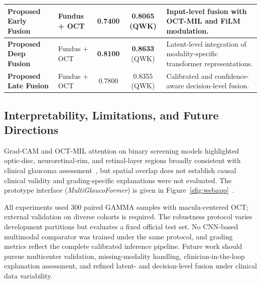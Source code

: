 \documentclass[sn-mathphys]{sn-jnl}%
\theoremstyle{thmstyleone}%
\theoremstyle{thmstyletwo}%
\theoremstyle{thmstylethree}%
\begin{document}
\begin{table}[!t]
{\begin{tabular}{|p{}|p{}|c|c|p{}|}
            \textbf{Proposed Early Fusion}                     &
            Fundus + OCT                                       &
            0.7400                                             &
            0.8065 (QWK)                                       &
            Input-level fusion with OCT-MIL and FiLM modulation.                               \\
            \hline
            \textbf{Proposed Deep Fusion}                      &
            Fundus + OCT                                       &
            \textbf{0.8100}                                    &
            \textbf{0.8633} (QWK)                              &
            Latent-level integration of modality-specific transformer representations.         \\
            \hline
            \textbf{Proposed Late Fusion}                      &
            Fundus + OCT                                       &
            0.7800                                             &
            0.8355 (QWK)                                       &
            Calibrated and confidence-aware decision-level fusion.                             \\
            \hline
        \end{tabular}}
\end{table}


\subsection{Interpretability, Limitations, and Future Directions}
\label{subsec:interpretability_discussion}

Grad-CAM and OCT-MIL attention on binary screening models highlighted optic-disc, neuroretinal-rim, and retinal-layer regions broadly consistent with clinical glaucoma assessment~\cite{kanski10}, but spatial overlap does not establish causal clinical validity and grading-specific explanations were not evaluated. The prototype interface (\textit{MultiGlaucoFormer}) is given in Figure~\ref{sfig:webapp}~\cite{multiglaucoformer_webapp}.

All experiments used 300 paired GAMMA samples with macula-centered OCT; external validation on diverse cohorts is required. The robustness protocol varies development partitions but evaluates a fixed official test set. No CNN-based multimodal comparator was trained under the same protocol, and grading metrics reflect the complete calibrated inference pipeline. Future work should pursue multicenter validation, missing-modality handling, clinician-in-the-loop explanation assessment, and refined latent- and decision-level fusion under clinical data variability.
\end{document}
